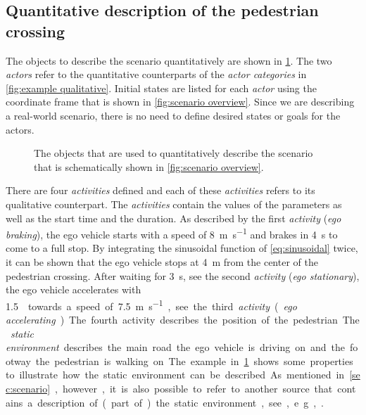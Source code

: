 \subsection{Quantitative description of the pedestrian crossing}
\label{sec:example quantitative}
The objects to describe the scenario quantitatively are shown in \cref{fig:example quantitative}. The two \textit{actors} refer to the quantitative counterparts of the \textit{actor categories} in \cref{fig:example qualitative}. Initial states are listed for each \textit{actor} using the coordinate frame that is shown in \cref{fig:scenario overview}. 
Since we are describing a real-world scenario, there is no need to define desired states or goals for the actors.

\cbend
\begin{figure}
	\centering
	
	\caption{\cbstart The objects that are used to quantitatively describe the scenario that is schematically shown in \cref{fig:scenario overview}. 
	}
	\label{fig:example quantitative}
\end{figure}
\cbstart

There are four \textit{activities} defined and each of these \textit{activities} refers to its qualitative counterpart. The \textit{activities} contain the values of the parameters as well as the start time and the duration. As described by the first \textit{activity} (\emph{ego braking}), the ego vehicle starts with a speed of \SI{8}{\meter\per\second} and brakes in \SI{4}{\second} to come to a full stop. By integrating the sinusoidal function of \cref{eq:sinusoidal} twice, it can be shown that the ego vehicle stops at \SI{4}{\meter} from the center of the pedestrian crossing. After waiting for \SI{3}{\second}, see the second \textit{activity} (\emph{ego stationary}), the ego vehicle accelerates with \SI{1.5}{\meter\per\second\square} towards a speed of \SI{7.5}{\meter\per\second}, see the third \textit{activity} (\emph{ego accelerating}). The fourth activity describes the position of the pedestrian.

The \textit{static environment} describes the main road the ego vehicle is driving on and the footway the pedestrian is walking on. The example in \cref{fig:example quantitative} shows some properties to illustrate how the static environment can be described. As mentioned in \cref{sec:scenario}, however, it is also possible to refer to another source that contains a description of (part of) the static environment, see, e.g., \cite{dupuis2010opendrive}. 

